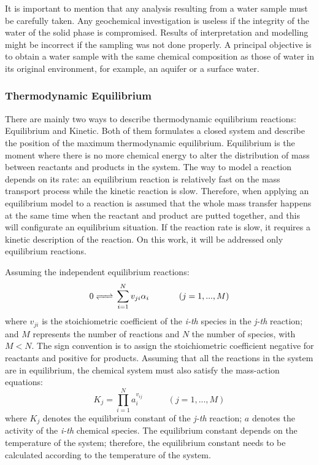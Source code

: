 \documentclass[ppgc,mestrado,english]{iiufrgs}
\begin{document}
It is important to mention that any analysis resulting from a water sample must be carefully taken. Any geochemical investigation is useless if the integrity of the water of the solid phase is compromised. Results of interpretation and modelling might be incorrect if the sampling was not done properly. A principal objective is to obtain a water sample with the same chemical composition as those of water in its original environment, for example, an aquifer or a surface water. \cite{Deutsch:97}

\subsubsection{Thermodynamic Equilibrium}
There are mainly two ways to describe thermodynamic equilibrium reactions: Equilibrium and Kinetic. Both of them formulates a closed system and describe the position of the maximum thermodynamic equilibrium. Equilibrium is the moment where there is no more chemical energy to alter the distribution of mass between reactants and products in the system. The way to model a reaction depends on its rate: an equilibrium reaction is relatively fast on the mass transport process while the kinetic reaction is slow. Therefore, when applying an equilibrium model to a reaction is assumed that the whole mass transfer happens at the same time when the reactant and product are putted together, and this will configurate an equilibrium situation. If the reaction rate is slow, it requires a kinetic description of the reaction. On this work, it will be addressed only equilibrium reactions.  \cite{Nordstrom:86}

Assuming the independent equilibrium reactions:
\begin{equation}\label{reaction}
0 \ce{<=>} \sum\limits_{i=1}^N  v_{ji} \alpha_i \hspace{35pt}    (j = 1, ... , M)
\end{equation}
where $v_{ji}$ is the stoichiometric coefficient of the \emph{i-th} species in the \emph{j-th} reaction; and $M$ represents the number of reactions and $N$ the number of species, with $M < N$. The sign convention is to assign the stoichiometric coefficient negative for reactants and positive for products. Assuming that all the reactions in the system are in equilibrium, the chemical system must also satisfy the mass-action equations:
\begin{equation}\label{equilibrium_reaction}
K_j =  \prod\limits_{i=1}^N  a_i^{v_{ij}} \hspace{35pt}    (j = 1, ... , M)
\end{equation}
where $K_j$ denotes the equilibrium constant of the \emph{j-th} reaction; $a$ denotes the activity of the \emph{i-th} chemical species. The equilibrium constant depends on the temperature of the system; therefore, the equilibrium constant needs to be calculated according to the temperature of the system. 
\end{document}
